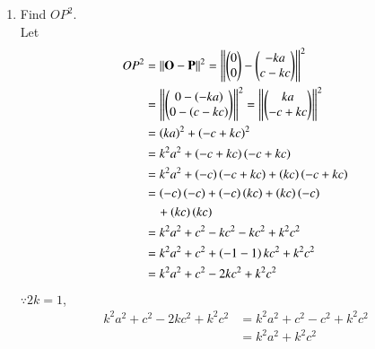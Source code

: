 \documentclass[journal,12pt,twocolumn]{IEEEtran}
\renewcommand\thesection{\arabic{section}}
\begin{document}
\begin{enumerate}[label=\thesection.\arabic*
,ref=\thesection.\theenumi]
\begin{align}
\vec{P}+\vec{R} &=  \myvec{-ka \\ c-kc} + \myvec{a-ka \\ -kc}\\
&=  \myvec{-ka+a-ka \\ c-kc-kc} =  \myvec{a-2ka \\ c-2kc}
\end{align}
%
Since $2k = 1$,
\begin{align}
\vec{P}+\vec{R} &=  \myvec{a-2ka \\ c-2kc} = \myvec{a-a \\ c-c} = \vec{0}
\end{align}
\item Find $OP^2$.
\\
\solution Let 
\begin{align*}
OP^2 &= \left\Vert\mathbf{O}-\mathbf{P}\right\Vert^2=\left\Vert\begin{pmatrix}0 \\0\end{pmatrix}-\begin{pmatrix}-ka \\c-kc\end{pmatrix}\right\Vert^2 
\\
&= \left\Vert\begin{pmatrix}0 -\left(-ka\right)\\0-\left(c-kc\right)\end{pmatrix}\right\Vert^2 
=\left\Vert\begin{pmatrix}ka\\-c+kc\end{pmatrix}\right\Vert^2 
\\
&=\left(ka\right)^2+\left(-c+kc\right)^2 
\\
&= k^2a^2+\left(-c+kc\right)\left(-c+kc\right)
\\
&= k^2a^2+\left(-c\right)\left(-c+kc\right)+\left(kc\right)\left(-c+kc\right)
\\
&=\left(-c\right)\left(-c\right)+\left(-c\right)\left(kc\right)+\left(kc\right)\left(-c\right)
\\
&\quad +\left(kc\right)\left(kc\right)
\\
&= k^2a^2+c^2-kc^2-kc^2+k^2c^2
\\
&=k^2a^2+c^2+\left(-1-1\right)kc^2+k^2c^2
\\
&=k^2a^2+c^2-2kc^2+k^2c^2
\end{align*}
$\because 2k=1$,
\begin{align}
k^2a^2+c^2-2kc^2+k^2c^2 &= k^2a^2+c^2-c^2+k^2c^2  
\\
&= k^2a^2 + k^2c^2
\end{align}


\end{enumerate}
\end{document}
